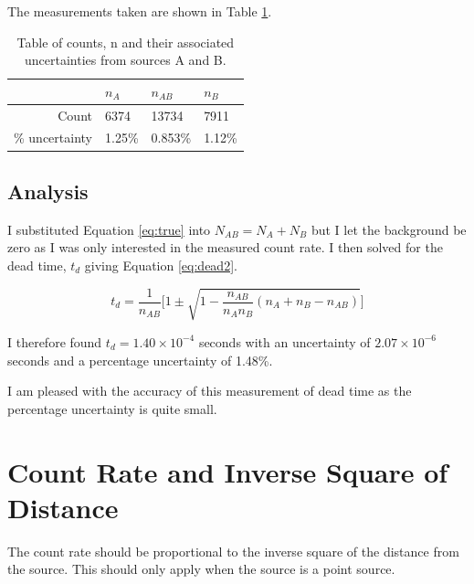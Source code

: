 \documentclass[twocolumn]{revtex4-1}
\begin{document}
The measurements taken are shown in Table \ref{table:dead}.

\begin{table}[!h]
\centering
\begin{tabular}{|r|l|l|l|}
\hline
                        & $n_{A}$  & $n_{AB}$  & $n_{B}$ \\ \hline
Count               & 6374       & 13734       & 7911      \\ \hline
\% uncertainty  & 1.25\%   & 0.853\%    & 1.12\%   \\ \hline
\end{tabular}
\caption{Table of counts, n and their associated uncertainties from sources A and B.}
\label{table:dead}
\end{table}

\vspace{-3ex}

\subsection{Analysis} 
\vspace{-3ex}

I substituted Equation \ref{eq:true} into $N_{AB}=N_{A}+N_{B}$ but I let the background be zero as I was only interested in the measured count rate.
I then solved for the dead time, $t_{d}$ giving Equation \ref{eq:dead2}.

\vspace{-3ex}

\begin{equation}
t_{d}=\dfrac{1}{n_{AB}}\Bigg[1\pm\sqrt{1-\dfrac{n_{AB}}{n_{A}n_{B}}(n_{A}+n_{B}-n_{AB})}\Bigg]
\label{eq:dead2}
\end{equation}

I therefore found $t_{d}=1.40\times10^{-4}$ seconds with an uncertainty of $2.07\times10^{-6}$ seconds and a percentage uncertainty of 1.48\%.

I am pleased with the accuracy of this measurement of dead time as the percentage uncertainty is quite small.

\vspace{-3ex}
\section{Count Rate and Inverse Square of Distance} 
\vspace{-3ex}

The count rate should be proportional to the inverse square of the distance from the source.
This should only apply when the source is a point source.\cite{inv}
\end{document}
